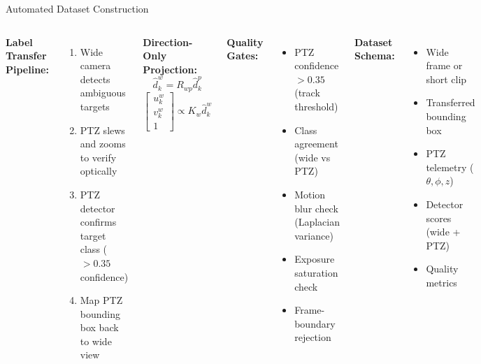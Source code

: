 \documentclass[aspectratio=169, 10pt]{beamer}
\begin{document}
\begin{frame}{Automated Dataset Construction}
\begin{columns}[T]
\textbf{Label Transfer Pipeline:}
\begin{enumerate}
\item Wide camera detects ambiguous targets
\item PTZ slews and zooms to verify optically
\item PTZ detector confirms target class ($> 0.35$ confidence)
\item Map PTZ bounding box back to wide view
\end{enumerate}

\vspace{0.5em}
\textbf{Direction-Only Projection:}
{\small
\[
\hat{d}^w_k = R_{wp}\hat{d}^p_k
\]
\[
\begin{bmatrix}u^w_k\\v^w_k\\1\end{bmatrix} \propto K_w \hat{d}^w_k
\]
}

\textbf{Quality Gates:}
\begin{itemize}
\item PTZ confidence $> 0.35$ (track threshold)
\item Class agreement (wide vs PTZ)
\item Motion blur check (Laplacian variance)
\item Exposure saturation check
\item Frame-boundary rejection
\end{itemize}

\vspace{0.5em}
\textbf{Dataset Schema:}
\begin{itemize}
\item Wide frame or short clip
\item Transferred bounding box
\item PTZ telemetry ($\theta, \phi, z$)
\item Detector scores (wide + PTZ)
\item Quality metrics
\end{itemize}
\end{columns}
\end{frame}
\end{document}
